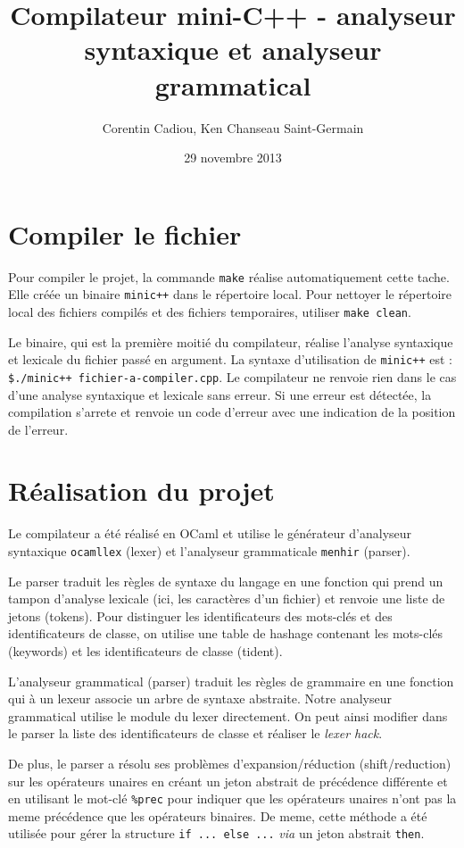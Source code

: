 \documentclass{article}
\title{Compilateur mini-C++ - analyseur syntaxique et analyseur grammatical}
\author{Corentin Cadiou, Ken Chanseau Saint-Germain}
\date{29 novembre 2013}
\begin{document}
\maketitle
\section*{Compiler le fichier}
Pour compiler le projet, la commande \texttt{make} réalise
automatiquement cette tache. Elle créée un binaire \texttt{minic++}
dans le répertoire local. Pour nettoyer le répertoire local des
fichiers compilés et des fichiers temporaires, utiliser \texttt{make clean}.

Le binaire, qui est la première moitié du compilateur, réalise
l'analyse syntaxique et lexicale du fichier passé en argument. La
syntaxe d'utilisation de \texttt{minic++} est : \texttt{\$./minic++
  fichier-a-compiler.cpp}. Le compilateur ne renvoie rien dans le cas
d'une analyse syntaxique et lexicale sans erreur. Si une erreur est
détectée, la compilation s'arrete et renvoie un code d'erreur avec une
indication de la position de l'erreur.
\section*{Réalisation du projet}
Le compilateur a été réalisé en OCaml et utilise le générateur
d'analyseur syntaxique \texttt{ocamllex} (lexer) et l'analyseur grammaticale
\texttt{menhir} (parser).

Le parser traduit les règles de syntaxe du langage en une fonction
qui prend un tampon d'analyse lexicale (ici, les caractères d'un
fichier) et renvoie une liste de jetons (tokens). Pour distinguer les
identificateurs des mots-clés et des identificateurs de classe, on
utilise une table de hashage contenant les mots-clés (keywords) et les
identificateurs de classe (tident).

L'analyseur grammatical (parser) traduit les règles de grammaire en
une fonction qui à un lexeur associe un arbre de syntaxe
abstraite. Notre analyseur grammatical utilise le module du lexer
directement. On peut ainsi modifier dans le parser la liste
des identificateurs de classe et réaliser le \emph{lexer hack}.

De plus, le parser a résolu ses problèmes d'expansion/réduction
(shift/reduction) sur les opérateurs unaires en créant un jeton
abstrait de précédence différente et en utilisant le mot-clé
\texttt{\%prec} pour indiquer que les opérateurs unaires n'ont pas la
meme précédence que les opérateurs binaires. De meme, cette méthode a
été utilisée pour gérer la structure \texttt{if ... else ...}
\emph{via} un jeton abstrait \texttt{then}.
\pagebreak
\end{document}

